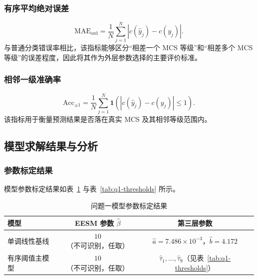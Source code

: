 \documentclass[bwprint]{gmcmthesis}
\numberwithin{figure}{section}
\begin{document}
\subsubsection{有序平均绝对误差}

\begin{equation}
	\boxed{
	\mathrm{MAE}_{\mathrm{ord}}=\frac{1}{N}\sum_{j=1}^{N}\left|c(\widehat y_j)-c(y_j)\right|.
	}
	\label{eq:ord-mae}
\end{equation}
与普通分类错误率相比，该指标能够区分``相差一个 MCS 等级''和``相差多个 MCS 等级''的误差程度，因此将其作为外层参数选择的主要评价标准。

\subsubsection{相邻一级准确率}

\begin{equation}
	\boxed{
	\mathrm{Acc}_{\pm1}=\frac{1}{N}\sum_{j=1}^{N}\mathbf{1}\left(\left|c(\widehat y_j)-c(y_j)\right|\le1\right).
	}
	\label{eq:acc-pm1}
\end{equation}
该指标用于衡量预测结果是否落在真实 MCS 及其相邻等级范围内。

\subsection{模型求解结果与分析}

\subsubsection{参数标定结果}

模型参数标定结果如表~\ref{tab:q1-params} 与表~\ref{tab:q1-thresholds} 所示。

\begin{table}[H]
	\centering
	\caption{问题一模型参数标定结果}
	\label{tab:q1-params}
	\begin{tabular}{lcc}
		\toprule
		模型 & EESM 参数 $\widehat\beta$ & 第三层参数 \\
		\midrule
		单调线性基线 & $10$（不可识别，任取） & $\widehat a=7.486\times10^{-3}$，$\widehat b=4.172$ \\
		有序阈值主模型 & $10$（不可识别，任取） & $\widehat\tau_1,\ldots,\widehat\tau_9$（见表~\ref{tab:q1-thresholds}） \\
		\bottomrule
	\end{tabular}
\end{table}
\end{document}
